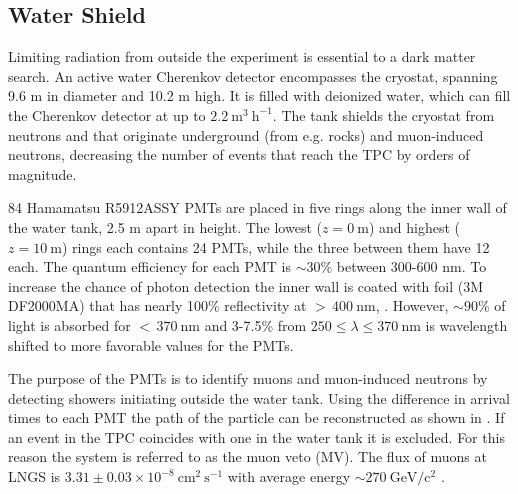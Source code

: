 \subsection{Water Shield}
\label{subsec:xenon1t_water_shield}
Limiting radiation from outside the experiment is essential to a dark matter search.  An active water Cherenkov detector encompasses the
cryostat, spanning 9.6 m in diameter and 10.2 m high.  It is filled with deionized water, which can fill the Cherenkov detector at up to
$2.2\ \mathrm{m^{3}\ h^{-1}}$.  The tank shields the cryostat from neutrons and \gammarays that originate underground (from e.g. rocks)
and muon-induced neutrons, decreasing the number of events that reach the TPC by orders of magnitude.

84 Hamamatsu R5912ASSY PMTs are placed in five rings along the inner wall of the water tank, 2.5 m apart in height.  The lowest
($z = 0\ \mathrm{m}$) and highest ($z = 10\ \mathrm{m}$) rings each contains 24 PMTs, while the three between them have 12 each.  The
quantum efficiency for each PMT is ${\sim}30\%$ between 300-600 nm.  To increase the chance of photon detection the inner wall is coated
with foil (3M DF2000MA) that has
nearly 100\% reflectivity at ${>}\, 400\ \mathrm{nm}$, .  However, ${\sim}90\%$ of light is absorbed for
${<}\,370\ \mathrm{nm}$ and 3-7.5\% from $250 \leq \lambda \leq 370\ \mathrm{nm}$ is wavelength shifted to more favorable values for the PMTs.

The purpose of the PMTs is to identify muons and muon-induced neutrons by detecting showers initiating
outside the water tank.  Using the difference in arrival times to each PMT the path of the particle can be reconstructed as shown in
.  If an event in the TPC coincides with one in the water tank it is excluded.  For this reason
the system is referred to as the muon veto (MV).  The flux of muons at LNGS is $3.31 \pm 0.03 \times 10^{-8}\ \mathrm{cm^2\ s^{-1}}$ with
average energy ${\sim}270\ \mathrm{GeV/c^2}$ .

